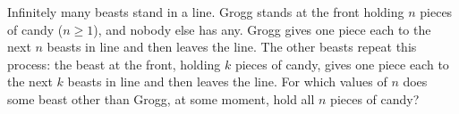 Infinitely many beasts stand in a line. Grogg stands at the front holding $n$ pieces of candy ($n\ge1$), and nobody else has any. Grogg gives one piece each to the next $n$ beasts in line and then leaves the line. The other beasts repeat this process: the beast at the front, holding $k$ pieces of candy, gives one piece each to the next $k$ beasts in line and then leaves the line. For which values of $n$ does some beast other than Grogg, at some moment, hold all $n$ pieces of candy?
